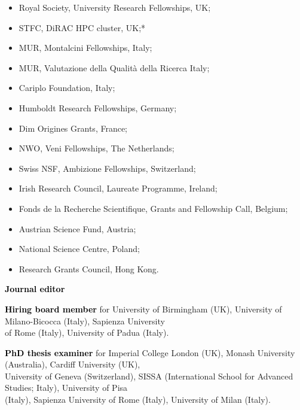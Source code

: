 \begin{minipage}[t]{\dimexpr(\textwidth-0.4cm-0.2cm)/2\relax}
\raggedright
\begin{itemize}[label=$\circ$,leftmargin=1em,labelsep=0.4em]
\item Royal Society, University Research Fellowships, UK;
\item STFC, DiRAC HPC cluster, UK;*
\item MUR, Montalcini Fellowships, Italy;
\item MUR, Valutazione della Qualità della Ricerca  Italy;
\item Cariplo Foundation, Italy;
\item Humboldt Research Fellowships, Germany;
\item Dim Origines Grants, France;
\item NWO, Veni Fellowships, The Netherlands;
\item Swiss NSF, Ambizione Fellowships, Switzerland;
\item Irish Research Council, Laureate Programme, Ireland;
\item Fonds de la Recherche Scientifique, Grants and Fellowship Call, Belgium;
\item Austrian Science Fund, Austria;
\item National Science Centre, Poland;
\item Research Grants Council, Hong Kong.
\end{itemize}
\end{minipage}

\vspace{0.2cm}
 \textbf{\textcolor{black}{Journal editor}}\vspace{0.1cm}\\
 \vspace{-0.1cm}
\vspace{0.2cm}

\vspace{0.2cm}
\textbf{\textcolor{black}{Hiring board member}} for University of Birmingham (UK), University of Milano-Bicocca (Italy), Sapienza University \\ \phantom{xx} of Rome (Italy), University of Padua (Italy). 

\vspace{0.2cm}
\textbf{\textcolor{black}{PhD thesis examiner}} for Imperial College London (UK),
Monash University (Australia),  Cardiff University (UK), 
\\ \phantom{xx}  University of Geneva (Switzerland), 
  SISSA (International School for Advanced Studies; Italy), 
 University of Pisa  \\ \phantom{xx}  (Italy), Sapienza University of Rome (Italy), University of Milan (Italy). %

